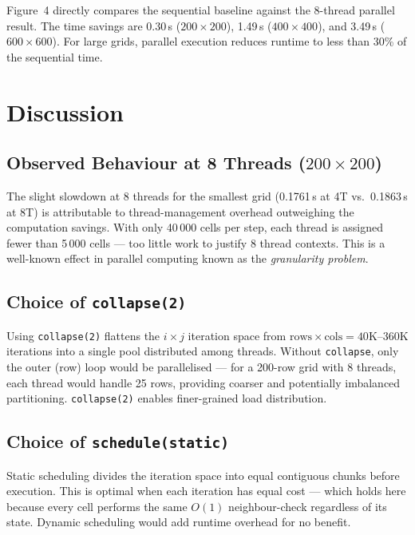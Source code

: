 \documentclass[12pt,a4paper]{article}
\begin{document}
Figure~4 directly compares the sequential baseline against the 8-thread parallel
result. The time savings are 0.30\,s ($200\times200$), 1.49\,s ($400\times400$),
and 3.49\,s ($600\times600$). For large grids, parallel execution reduces runtime
to less than 30\% of the sequential time.

\section{Discussion}

\subsection{Observed Behaviour at 8 Threads ($200\times200$)}

The slight slowdown at 8 threads for the smallest grid (0.1761\,s at 4T vs.\
0.1863\,s at 8T) is attributable to thread-management overhead outweighing the
computation savings. With only 40\,000 cells per step, each thread is assigned fewer
than 5\,000 cells --- too little work to justify 8 thread contexts. This is a
well-known effect in parallel computing known as the \emph{granularity problem}.

\subsection{Choice of \texttt{collapse(2)}}

Using \texttt{collapse(2)} flattens the $i \times j$ iteration space from
$\text{rows} \times \text{cols} = 40\text{K}$--$360\text{K}$ iterations into a
single pool distributed among threads. Without \texttt{collapse}, only the outer
(row) loop would be parallelised --- for a 200-row grid with 8 threads, each thread
would handle 25 rows, providing coarser and potentially imbalanced partitioning.
\texttt{collapse(2)} enables finer-grained load distribution.

\subsection{Choice of \texttt{schedule(static)}}

Static scheduling divides the iteration space into equal contiguous chunks before
execution. This is optimal when each iteration has equal cost --- which holds here
because every cell performs the same $O(1)$ neighbour-check regardless of its state.
Dynamic scheduling would add runtime overhead for no benefit.
\end{document}
